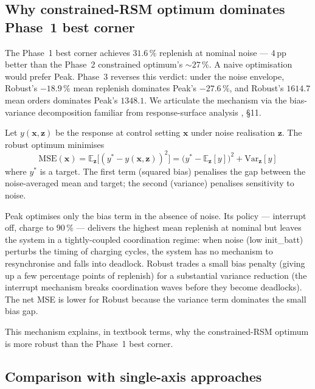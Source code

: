 \documentclass[conference]{IEEEtran}
\begin{document}
\subsection{Why constrained-RSM optimum dominates Phase~1 best corner}
\label{sec:mech_robust_wins}

The Phase~1 best corner achieves $31.6\,\%$ replenish at nominal noise --- $4\,$pp better than the Phase~2 constrained optimum's $\sim 27\,\%$. A naive optimisation would prefer Peak. Phase~3 reverses this verdict: under the noise envelope, Robust's $-18.9\,\%$ mean replenish dominates Peak's $-27.6\,\%$, and Robust's $1614.7$ mean orders dominates Peak's $1348.1$. We articulate the mechanism via the bias-variance decomposition familiar from response-surface analysis \cite{myers2016}, \S 11.

Let $y(\mathbf{x}, \mathbf{z})$ be the response at control setting $\mathbf{x}$ under noise realisation $\mathbf{z}$. The robust optimum minimises
\begin{equation}
  \text{MSE}(\mathbf{x}) = \mathbb{E}_{\mathbf{z}}\big[(y^* - y(\mathbf{x}, \mathbf{z}))^2\big] = \big(y^* - \mathbb{E}_\mathbf{z}[y]\big)^2 + \text{Var}_\mathbf{z}[y]
\end{equation}
where $y^*$ is a target. The first term (squared bias) penalises the gap between the noise-averaged mean and target; the second (variance) penalises sensitivity to noise.

Peak optimises only the bias term in the absence of noise. Its policy --- interrupt off, charge to $90\,\%$ --- delivers the highest mean replenish at nominal but leaves the system in a tightly-coupled coordination regime: when noise (low init\_batt) perturbs the timing of charging cycles, the system has no mechanism to resynchronise and falls into deadlock. Robust trades a small bias penalty (giving up a few percentage points of replenish) for a substantial variance reduction (the interrupt mechanism breaks coordination waves before they become deadlocks). The net MSE is lower for Robust because the variance term dominates the small bias gap.

This mechanism explains, in textbook terms, why the constrained-RSM optimum is more robust than the Phase~1 best corner.

\subsection{Comparison with single-axis approaches}
\label{sec:vs_single_axis}
\end{document}
